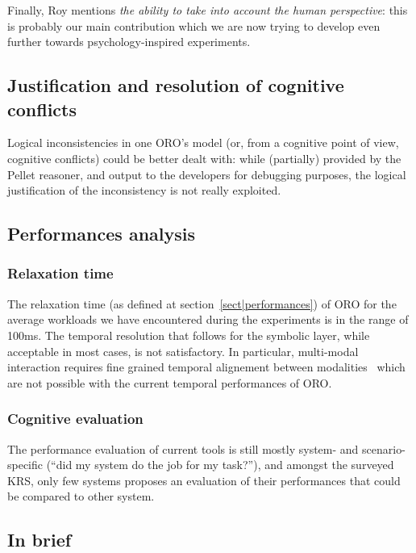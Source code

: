 Finally, Roy mentions \emph{the ability to take into account the human
perspective}: this is probably our main contribution which we are now trying to
develop even further towards psychology-inspired experiments.


\subsection{Justification and resolution of cognitive conflicts}

Logical inconsistencies in one ORO's model (or, from a cognitive point of view,
cognitive conflicts) could be better dealt with: while (partially) provided by
the Pellet reasoner, and output to the developers for debugging purposes, the
logical justification of the inconsistency is not really exploited.




\subsection{Performances analysis}

\subsubsection{Relaxation time}

The relaxation time (as defined at section~\ref{sect|performances}) of ORO for
the average workloads we have encountered during the experiments is in the
range of 100ms.  The temporal resolution that follows for the symbolic layer,
while acceptable in most cases, is not satisfactory. In particular, multi-modal
interaction requires fine grained temporal alignement between
modalities~\cite{Li2012} which are not possible with the current temporal
performances of ORO.

\subsubsection{Cognitive evaluation}

The performance evaluation of current tools is still mostly system- and
scenario-specific (``did my system do the job for my task?''), and amongst the
surveyed KRS, only few systems proposes an evaluation of their performances
that could be compared to other system.





\subsection{In brief}

